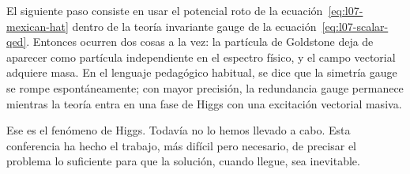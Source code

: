 El siguiente paso consiste en usar el potencial roto de la ecuación~\eqref{eq:l07-mexican-hat} dentro de la teoría invariante gauge de la ecuación~\eqref{eq:l07-scalar-qed}. Entonces ocurren dos cosas a la vez: la partícula de Goldstone deja de aparecer como partícula independiente en el espectro físico, y el campo vectorial adquiere masa. En el lenguaje pedagógico habitual, se dice que la simetría gauge se rompe espontáneamente; con mayor precisión, la redundancia gauge permanece mientras la teoría entra en una fase de Higgs con una excitación vectorial masiva.

Ese es el fenómeno de Higgs. Todavía no lo hemos llevado a cabo. Esta conferencia ha hecho el trabajo, más difícil pero necesario, de precisar el problema lo suficiente para que la solución, cuando llegue, sea inevitable.
